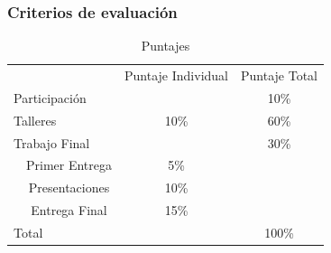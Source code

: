 \documentclass[
  shownotes,
  xcolor={svgnames},
  hyperref={colorlinks,citecolor=DarkBlue,linkcolor=DarkRed,urlcolor=DarkBlue}
  , aspectratio=169]{beamer}
\begin{document}
\begin{frame}
\frametitle{Criterios de evaluación}

\begin{table}[H]
\centering
\caption{Puntajes}
\scriptsize
\begin{tabular}{lccc}
\hline
 \hline
\multicolumn{2}{l}{}                       & Puntaje Individual & Puntaje Total \\
\multicolumn{2}{l}{Participación}          &                    & 10\%          \\
\multicolumn{2}{l}{Talleres}               & 10\%               & 60\%          \\
\multicolumn{2}{l}{Trabajo Final}        &                    & 30\%          \\
              & Primer Entrega             & 5\%                &               \\
              & Presentaciones             & 10\%               &               \\
               & Entrega Final            & 15\%               &               \\
\multicolumn{2}{l}{Total}                  &                    & 100\%        \\
\hline
 \hline
\end{tabular}
\end{table}


\end{frame}


\end{document}
